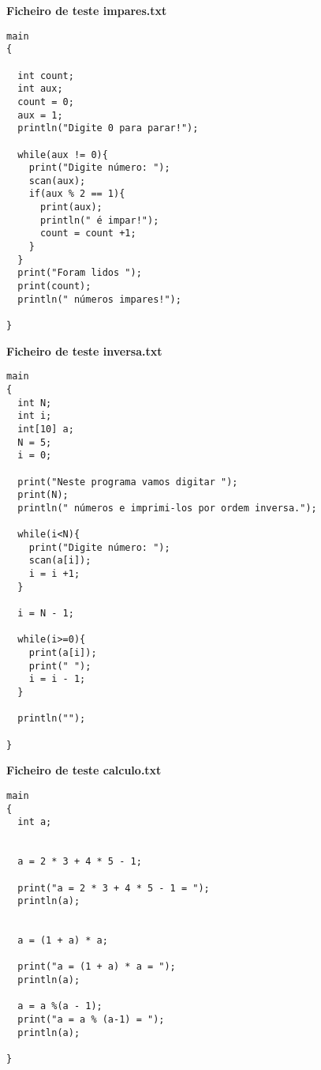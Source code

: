 \documentclass[11pt,a4paper]{report}%
\begin{document}
\textbf{Ficheiro de teste impares.txt}
\begin{scriptsize}
\begin{verbatim}
main
{
  
  int count;
  int aux;
  count = 0;
  aux = 1;
  println("Digite 0 para parar!");
  
  while(aux != 0){
    print("Digite número: ");
    scan(aux);
    if(aux % 2 == 1){
      print(aux);
      println(" é impar!");
      count = count +1;
    }
  }
  print("Foram lidos ");
  print(count);
  println(" números impares!");

}
\end{verbatim}
\end{scriptsize}


\textbf{Ficheiro de teste inversa.txt}
\begin{scriptsize}
\begin{verbatim}
main
{
  int N;
  int i;
  int[10] a;
  N = 5;
  i = 0;

  print("Neste programa vamos digitar ");
  print(N);
  println(" números e imprimi-los por ordem inversa.");

  while(i<N){
    print("Digite número: ");
    scan(a[i]); 
    i = i +1;
  }

  i = N - 1;

  while(i>=0){
    print(a[i]);
    print(" ");
    i = i - 1;
  }

  println("");

}
\end{verbatim}
\end{scriptsize}


\textbf{Ficheiro de teste calculo.txt}
\begin{scriptsize}
\begin{verbatim}
main
{
  int a;


  a = 2 * 3 + 4 * 5 - 1;
  
  print("a = 2 * 3 + 4 * 5 - 1 = ");
  println(a);
  

  a = (1 + a) * a;
  
  print("a = (1 + a) * a = ");
  println(a);

  a = a %(a - 1);
  print("a = a % (a-1) = ");
  println(a); 

}
\end{verbatim}
\end{scriptsize}
\end{document}
